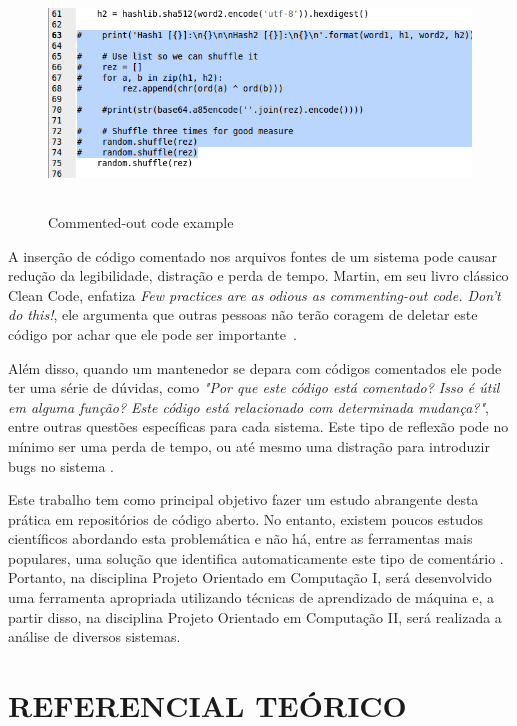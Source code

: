 \documentclass{abnt}
\begin{document}
\begin{figure}[h!]
  \centering
  \includegraphics[height=2.4in,width=6.3in]{images/gcc06.png}
  \caption{Commented-out code example }
  \label{fig:commentExample}
\end{figure}


A inserção de código comentado nos arquivos fontes de um sistema pode causar
redução da legibilidade, distração e perda de tempo. Martin, em seu livro clássico
Clean Code, enfatiza \textit{Few practices are as odious as commenting-out code. 
Don’t do this!}, ele argumenta que outras pessoas não terão coragem de deletar 
este código por achar que ele pode ser importante~\cite{cleanCode}. 

Além disso, quando um mantenedor se depara com códigos comentados ele pode ter uma 
série de dúvidas, como \textit{"Por que este código está comentado? Isso é útil em 
alguma função? Este código está relacionado com determinada mudança?"}, entre outras 
questões específicas para cada sistema. Este tipo de reflexão pode no mínimo ser 
uma perda de tempo, ou até mesmo uma distração para introduzir bugs no sistema \cite{cleanCode}.

Este trabalho tem como principal objetivo fazer um estudo abrangente desta prática em repositórios 
de código aberto. No entanto, existem poucos estudos científicos abordando esta problemática e não 
há, entre as ferramentas mais populares, uma solução que identifica automaticamente
este tipo de comentário \cite{articleMiningComments}. Portanto, na disciplina Projeto Orientado
em Computação I, será desenvolvido uma ferramenta apropriada utilizando técnicas de aprendizado de 
máquina e, a partir disso, na disciplina Projeto Orientado em Computação II, será realizada a análise de
diversos sistemas. 


\chapter{REFERENCIAL TEÓRICO}
\end{document}
